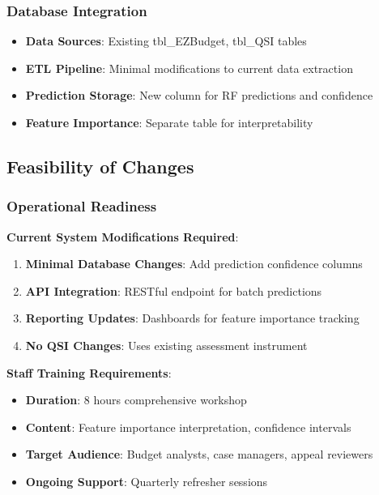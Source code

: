 \subsubsection{Database Integration}
\begin{itemize}
    \item \textbf{Data Sources}: Existing tbl\_EZBudget, tbl\_QSI tables
    \item \textbf{ETL Pipeline}: Minimal modifications to current data extraction
    \item \textbf{Prediction Storage}: New column for RF predictions and confidence
    \item \textbf{Feature Importance}: Separate table for interpretability
\end{itemize}

\subsection{Feasibility of Changes}

\subsubsection{Operational Readiness}

\textbf{Current System Modifications Required}:
\begin{enumerate}
    \item \textbf{Minimal Database Changes}: Add prediction confidence columns
    \item \textbf{API Integration}: RESTful endpoint for batch predictions
    \item \textbf{Reporting Updates}: Dashboards for feature importance tracking
    \item \textbf{No QSI Changes}: Uses existing assessment instrument
\end{enumerate}

\textbf{Staff Training Requirements}:
\begin{itemize}
    \item \textbf{Duration}: 8 hours comprehensive workshop
    \item \textbf{Content}: Feature importance interpretation, confidence intervals
    \item \textbf{Target Audience}: Budget analysts, case managers, appeal reviewers
    \item \textbf{Ongoing Support}: Quarterly refresher sessions
\end{itemize}


